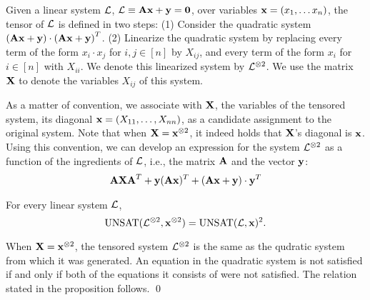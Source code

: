 \begin{definition}
  Given a linear system ${\cal L}$, ${\cal L} \equiv {\bf Ax + y = 0}$, over variables 
  ${\bf x} = (x_1, \ldots x_n)$, the tensor of
  ${\cal L}$ is defined in two steps: (1) Consider the quadratic system $\left({\bf Ax + y}\right) \cdot \left({\bf Ax +
      y} \right)^T$. (2) Linearize the quadratic system by replacing every term of the form $x_i \cdot x_j$ for
  $i, j \in [n]$ by $X_{ij}$, and every term of the form $x_i$ for $i\in [n]$ with $X_{ii}$. We denote this linearized system by ${\cal L}^{\otimes
    2}$. We use the matrix ${\bf X}$ to denote the variables $X_{ij}$ of this system.
\end{definition} 
As a matter of convention, we associate with ${\bf X}$, the variables of the tensored system, 
its diagonal ${\bf x} = (X_{11},\ldots,X_{nn})$, as a candidate assignment to the original system. 
Note that when ${\bf X} = {\bf x}^{\otimes 2}$, it indeed holds that ${\bf X}$'s diagonal is ${\bf x}$.
Using this convention, we can develop an expression for the system ${\cal L}^{\otimes 2}$ as a 
function of the ingredients of ${\cal L}$, i.e., the matrix ${\bf A}$ and the vector ${\bf y}$:
\begin{eqnarray}\label{eq:tensored-system}
{\bf AXA}^T + {\bf y}({\bf Ax})^T + \left({\bf Ax} + {\bf y} \right)\cdot {\bf y}^T
\end{eqnarray}


\begin{proposition}\label{basic}
  For every linear system ${\cal L}$,
\[
    \mbox{UNSAT}({\cal L}^{\otimes 2}, {\bf x}^{\otimes 2}) = \mbox{UNSAT}({\cal L}, {\bf x})^2.
\]
\end{proposition}
 When ${\bf X} = {\bf x}^{\otimes 2}$, the tensored system ${\cal L}^{\otimes 2}$ is the same as the qudratic system from which it was generated. An equation in the quadratic system is not satisfied if and only if both of the equations it consists of were not satisfied. The relation stated in the proposition follows. \qed \\


